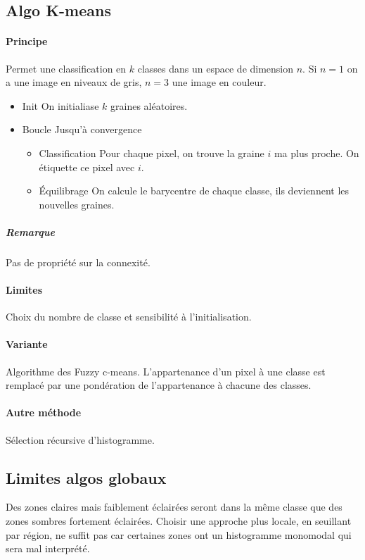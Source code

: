 \documentclass[french]{article}
\begin{document}
\subsection{Algo K-means}
\paragraph{Principe} Permet une classification en $k$ classes dans un
espace de dimension $n$. Si $n=1$ on a une image en niveaux de gris, $n=3$
une image en couleur.
\begin{itemize}
\item{Init} On initialiase $k$ graines aléatoires.
\item{Boucle} Jusqu'à convergence
\begin{itemize}
\item{Classification} Pour chaque pixel, on trouve la graine $i$ ma plus
proche. On étiquette ce pixel avec $i$.
\item{Équilibrage} On calcule le barycentre de chaque classe, ils deviennent
les nouvelles graines.
\end{itemize}
\end{itemize}

\subparagraph{Remarque}Pas de propriété sur la connexité.

\paragraph{Limites} Choix du nombre de classe et sensibilité à l'initialisation.

\paragraph{Variante} Algorithme des Fuzzy c-means. L'appartenance d'un
pixel à une classe est remplacé par une pondération de l'appartenance à
chacune des classes.

\paragraph{Autre méthode} Sélection récursive d'histogramme.

\subsection{Limites algos globaux} Des zones claires mais faiblement éclairées
seront dans la même classe que des zones sombres fortement éclairées.
Choisir une approche plus locale, en seuillant par région, ne suffit pas
car certaines zones ont un histogramme monomodal qui sera mal interprété.
\end{document}
